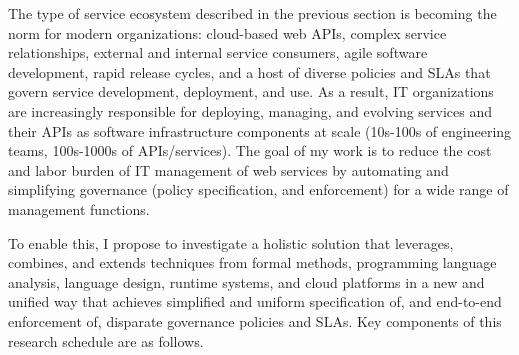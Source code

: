 The type of service ecosystem described in the previous section 
is becoming the norm for modern organizations: cloud-based web APIs, 
complex service relationships, external and
internal service consumers, agile software development, rapid release
cycles, and a host of diverse policies and SLAs that
govern service development, deployment, and use.  
As a result, IT organizations are increasingly responsible 
for deploying, managing, and evolving services
and their APIs as software infrastructure components at scale (10s-100s
of engineering teams, 100s-1000s of APIs/services).  The goal of my work
is to reduce the cost and labor burden of IT management of web services
by automating and simplifying governance (policy specification, 
and enforcement) for a wide range of management functions.

To enable this, I propose to investigate
a holistic solution that leverages, combines, and extends techniques from 
formal methods, programming language analysis, 
language design, runtime systems, and cloud platforms in a new 
and unified way that achieves simplified and uniform specification of,
and end-to-end enforcement of, disparate governance policies and SLAs.
Key components of this research schedule are as follows.

